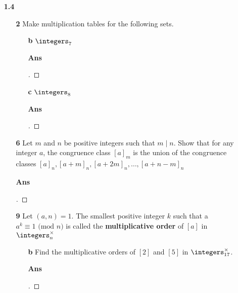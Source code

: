 \documentclass[paper=usletter, fontsize=12pt]{article}
\begin{document}
\begin{itemize}
        \item[\textbf{1.4}]

        \begin{itemize}

            \item[\textbf{2}] Make multiplication tables for the following
            sets.

            \begin{itemize}

                \item[\textbf{b}] $\integers_7$
                \item[\textbf{Ans}]
                \begin{proof}[\unskip\nopunct]
                \end{proof}
                \vspace{0.2in}

                \item[\textbf{c}] $\integers_8$
                \item[\textbf{Ans}]
                \begin{proof}[\unskip\nopunct]
                \end{proof}
                \vspace{0.2in}

            \end{itemize}

            \item[\textbf{6}] Let $m$ and $n$ be positive integers such that
            $m\mid n$. Show that for any integer $a$, the congruence class
            $[a]_m$ is the union of the congruence classes $[a]_n, [a+m]_n, [a+2m]_n, \ldots, [a+n-m]_n$
            \item[\textbf{Ans}]
            \begin{proof}[\unskip\nopunct]
            \end{proof}
            \vspace{0.2in}

            \item[\textbf{9}] Let $(a, n)=1$. The smallest positive integer $k$
            such that a $a^k \equiv 1 \text{ (mod  $n$)}$ is called the
            \textbf{multiplicative order} of $[a]$ in $\integers_n^\times$
            \begin{itemize}

                \item[\textbf{b}] Find the multiplicative orders of $[2]$ and
                $[5]$ in $\integers_{17}^\times$.
                \item[\textbf{Ans}]
                \begin{proof}[\unskip\nopunct]
                \end{proof}
                \vspace{0.2in}


\end{itemize}
\end{itemize}
\end{itemize}
\end{document}
